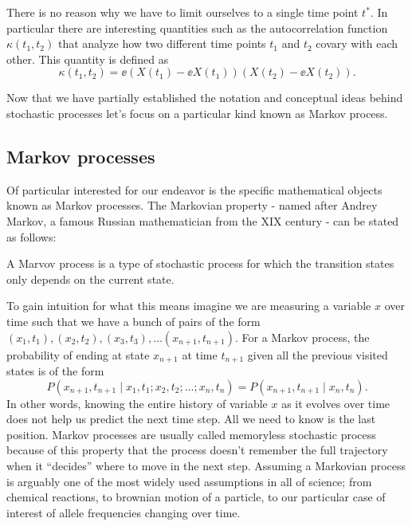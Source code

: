 There is no reason why we have to limit ourselves to a single time point $t^*$.
In particular there are interesting quantities such as the autocorrelation
function $\kappa(t_1, t_2)$ that analyze how two different time points $t_1$
and $t_2$ covary with each other. This quantity is defined as
\begin{equation}
  \kappa(t_1, t_2) = \ee{\left(X(t_1) - \ee{X(t_1)}\right)
                         \left(X(t_2) - \ee{X(t_2)}\right)}.
\end{equation}

Now that we have partially established the notation and conceptual ideas behind
stochastic processes let's focus on a particular kind known as Markov process.

\subsection{Markov processes}
Of particular interested for our endeavor is the specific mathematical objects
known as Markov processes. The Markovian property - named after Andrey Markov,
a famous Russian mathematician from the XIX century - can be stated as follows:
\begin{tcolorbox}
  A Marvov process is a type of stochastic process for which the transition
  states only depends on the current state.
\end{tcolorbox}
To gain intuition for what this means imagine we are measuring a variable $x$
over time such that we have a bunch of pairs of the form $(x_1, t_1), (x_2,
t_2), (x_3, t_3), \ldots (x_{n+1}, t_{n+1})$. For a Markov process, the
probability of ending at state $x_{n+1}$ at time $t_{n+1}$ given all the
previous visited states is of the form
\begin{equation}
  P(x_{n+1}, t_{n+1} \mid x_1, t_1; x_2, t_2; \ldots; x_n, t_n) =
  P(x_{n+1}, t_{n+1} \mid x_n, t_n).
  \label{eq_chapman_kolmogorov}
\end{equation}
In other words, knowing the entire history of variable $x$ as it evolves over
time does not help us predict the next time step. All we need to know is the
last position. Markov processes are usually called memoryless stochastic
process because of this property that the process doesn't remember the full
trajectory when it ``decides'' where to move in the next step. Assuming a
Markovian process is arguably one of the most widely used assumptions in all of
science; from chemical reactions, to brownian motion of a particle, to our
particular case of interest of allele frequencies changing over time.

